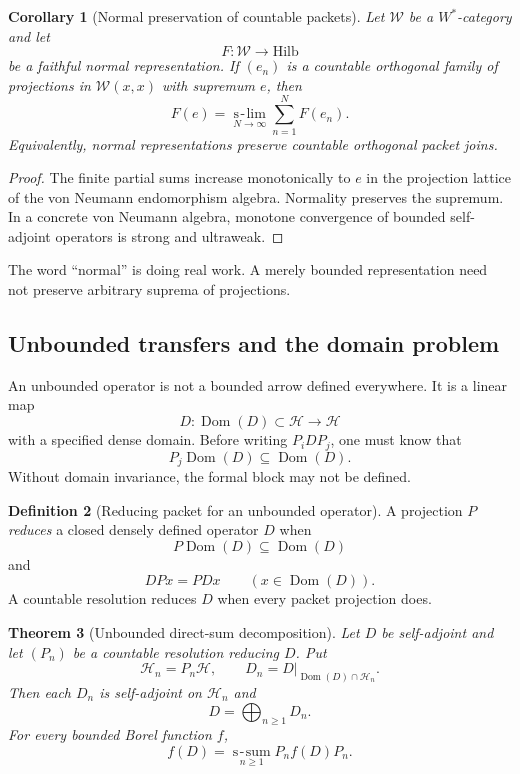 \documentclass[11pt]{article}
\newtheorem{theorem}{Theorem}[section]
\newtheorem{corollary}[theorem]{Corollary}
\theoremstyle{definition}
\newtheorem{definition}[theorem]{Definition}
\theoremstyle{remark}
\begin{document}
\begin{corollary}[Normal preservation of countable packets]
Let $\mathcal W$ be a $W^*$-category and let
\[
F:\mathcal W\to\mathrm{Hilb}
\]
be a faithful normal representation.  If $(e_n)$ is a countable orthogonal family of projections in $\mathcal W(x,x)$ with supremum $e$, then
\[
F(e)=\operatorname*{s\! -\! lim}_{N\to\infty}\sum_{n=1}^NF(e_n).
\]
Equivalently, normal representations preserve countable orthogonal packet joins.
\end{corollary}

\begin{proof}
The finite partial sums increase monotonically to $e$ in the projection lattice of the von Neumann endomorphism algebra.  Normality preserves the supremum.  In a concrete von Neumann algebra, monotone convergence of bounded self-adjoint operators is strong and ultraweak.
\end{proof}

The word ``normal'' is doing real work.  A merely bounded representation need not preserve arbitrary suprema of projections.

\subsection{Unbounded transfers and the domain problem}

An unbounded operator is not a bounded arrow defined everywhere.  It is a linear map
\[
D:\operatorname{Dom}(D)\subset\mathcal H\to\mathcal H
\]
with a specified dense domain.  Before writing $P_iDP_j$, one must know that
\[
P_j\operatorname{Dom}(D)\subseteq\operatorname{Dom}(D).
\]
Without domain invariance, the formal block may not be defined.

\begin{definition}[Reducing packet for an unbounded operator]
A projection $P$ \emph{reduces} a closed densely defined operator $D$ when
\[
P\operatorname{Dom}(D)\subseteq\operatorname{Dom}(D)
\]
and
\[
DPx=PDx
\qquad
(x\in\operatorname{Dom}(D)).
\]
A countable resolution reduces $D$ when every packet projection does.
\end{definition}

\begin{theorem}[Unbounded direct-sum decomposition]
Let $D$ be self-adjoint and let $(P_n)$ be a countable resolution reducing $D$.  Put
\[
\mathcal H_n=P_n\mathcal H,
\qquad
D_n=D|_{\operatorname{Dom}(D)\cap\mathcal H_n}.
\]
Then each $D_n$ is self-adjoint on $\mathcal H_n$ and
\[
D=\bigoplus_{n\ge1}D_n.
\]
For every bounded Borel function $f$,
\[
f(D)=\operatorname*{s\! -\! sum}_{n\ge1}P_nf(D)P_n.
\]
\end{theorem}
\end{document}
